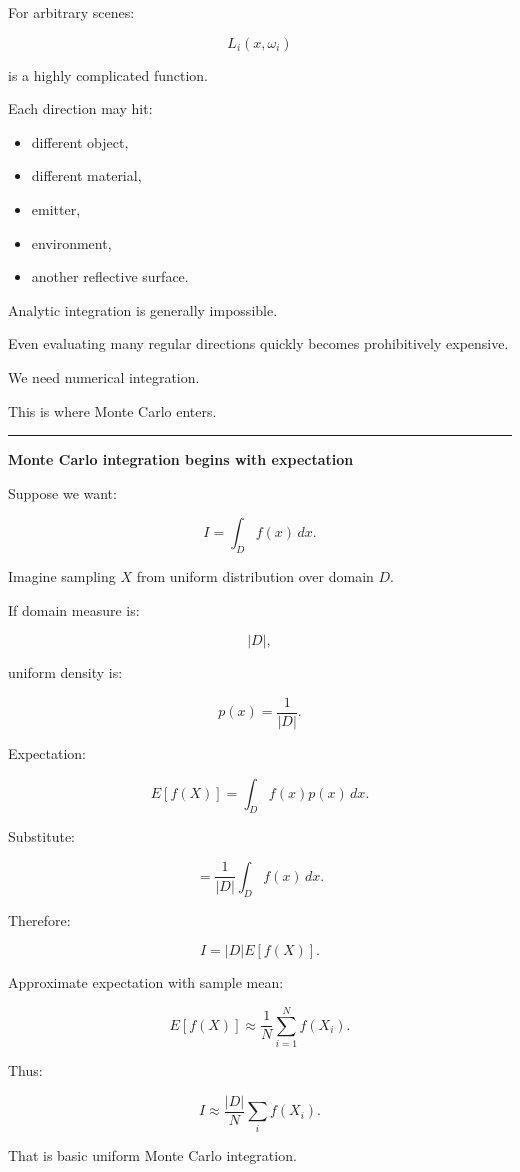 For arbitrary scenes:

\[
L_i(x,\omega_i)
\]

is a highly complicated function.

Each direction may hit:

\begin{itemize}
\tightlist
\item
  different object,
\item
  different material,
\item
  emitter,
\item
  environment,
\item
  another reflective surface.
\end{itemize}

Analytic integration is generally impossible.

Even evaluating many regular directions quickly becomes prohibitively expensive.

We need numerical integration.

This is where Monte Carlo enters.

\begin{center}\rule{0.5\linewidth}{0.5pt}\end{center}

\textbf{Monte Carlo integration begins with expectation}

Suppose we want:

\[
I=
\int_D f(x)\,dx.
\]

Imagine sampling \(X\) from uniform distribution over domain \(D\).

If domain measure is:

\[
|D|,
\]

uniform density is:

\[
p(x)=\frac1{|D|}.
\]

Expectation:

\[
E[f(X)]
=
\int_D
f(x)p(x)\,dx.
\]

Substitute:

\[
=
\frac1{|D|}
\int_D f(x)\,dx.
\]

Therefore:

\[
I=
|D|E[f(X)].
\]

Approximate expectation with sample mean:

\[
E[f(X)]
\approx
\frac1N
\sum_{i=1}^{N}
f(X_i).
\]

Thus:

\[
\boxed{
I
\approx
\frac{|D|}{N}
\sum_i f(X_i).
}
\]

That is basic uniform Monte Carlo integration.

